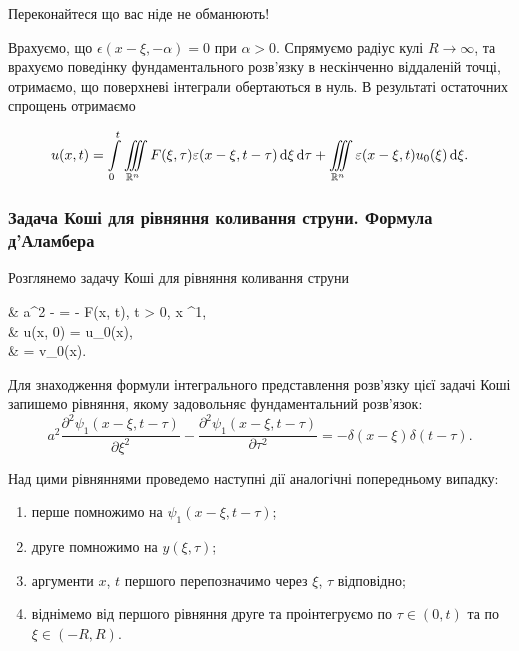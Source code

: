 \begin{exercise}
	Переконайтеся що вас ніде не обманюють!
\end{exercise}

Врахуємо, що $\epsilon(x - \xi, - \alpha) = 0$ при $\alpha > 0$. Спрямуємо радіус кулі $R \to \infty$, та врахуємо поведінку фундаментального розв'язку в нескінченно віддаленій точці, отримаємо, що поверхневі інтеграли обертаються в нуль. В результаті остаточних спрощень отримаємо 
\begin{th_formula}
	\begin{equation}
		u(x, t) = \displaystyle\int\limits_0^t \displaystyle\iiint\limits_{\mathbb{R}^n} F(\xi, \tau) \varepsilon(x - \xi, t - \tau) \mathop{}\!\mathrm{d} \xi \mathop{}\!\mathrm{d} \tau + \displaystyle\iiint\limits_{\mathbb{R}^n} \varepsilon(x - \xi, t) u_0(\xi) \mathop{}\!\mathrm{d} \xi.
	\end{equation}
\end{th_formula}

\subsubsection{Задача Коші для рівняння коливання струни. Формула д'Аламбера}

\begin{example}
	Розглянемо задачу Коші для рівняння коливання струни
	\begin{system}
		& a^2  -  = - F(x, t), \quad t > 0, \quad x \in \RR^1, \\
		& u(x, 0) = u_0(x), \\
		&  = v_0(x).
	\end{system}
\end{example}

Для знаходження формули інтегрального представлення розв'язку цієї задачі Коші запишемо рівняння, якому задовольняє фундаментальний розв'язок:
\begin{equation}
	a^2 \frac{\partial^2 \psi_1(x - \xi, t - \tau)}{\partial \xi^2} - \frac{\partial^2 \psi_1(x - \xi, t - \tau)}{\partial \tau^2} = -\delta(x - \xi) \delta(t - \tau).
\end{equation}

Над цими рівняннями проведемо наступні дії аналогічні попередньому випадку:
\begin{enumerate}
	\item перше помножимо на $\psi_1(x - \xi, t - \tau)$;
	\item друге помножимо на $y(\xi, \tau)$;
	\item аргументи $x$, $t$ першого перепозначимо через $\xi$, $\tau$ відповідно;
	\item віднімемо від першого рівняння друге та проінтегруємо по $\tau \in (0, t)$ та по $\xi \in (-R, R)$.
\end{enumerate}

